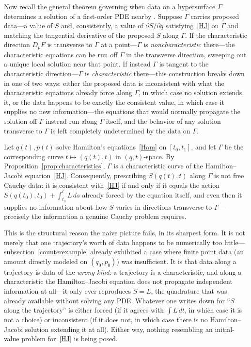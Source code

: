 Now recall the general theorem governing when data on a hypersurface $\Gamma$
determines a solution of a first-order PDE nearby
\cite{evans2010,courant-hilbert1962}. Suppose $\Gamma$ carries proposed
data---a value of $S$ and, consistently, a value of $\partial S/\partial q$
satisfying~\eqref{HJ} on $\Gamma$ and matching the tangential derivative of the
proposed $S$ along $\Gamma$. If the characteristic direction $D_pF$ is
transverse to $\Gamma$ at a point---$\Gamma$ is \emph{noncharacteristic}
there---the characteristic equations can be run off $\Gamma$ in the transverse
direction, sweeping out a unique local solution near that point. If instead
$\Gamma$ is tangent to the characteristic direction---$\Gamma$ is
\emph{characteristic} there---this construction breaks down in one of two ways:
either the proposed data is inconsistent with what the characteristic equations
already force along $\Gamma$, in which case no solution extends it, or the data
happens to be exactly the consistent value, in which case it supplies no new
information---the equations that would normally propagate the solution off
$\Gamma$ instead run along $\Gamma$ itself, and the behavior of any solution
transverse to $\Gamma$ is left completely undetermined by the data on $\Gamma$.

\begin{proposition}
\label{prop:trajectory-characteristic}
Let $q(t),p(t)$ solve Hamilton's equations~\eqref{Ham} on $[t_0,t_1]$, and let
    $\Gamma$ be the corresponding curve $t\mapsto(q(t),t)$ in $(q,t)$-space. By
    Proposition~\ref{prop:characteristics}, $\Gamma$ is a characteristic curve
    of the Hamilton--Jacobi equation~\eqref{HJ}. Consequently, prescribing
    $S(q(t),t)$ along $\Gamma$ is not free Cauchy data: it is consistent
    with~\eqref{HJ} if and only if it equals the action
    $S(q(t_0),t_0)+\int_{t_0}^t L\,ds$ already forced by the equation itself,
    and even then it supplies no information about how $S$ varies in directions
    transverse to $\Gamma$---precisely the information a genuine Cauchy problem
    requires.
\end{proposition}

This is the structural reason the naive picture fails, in its sharpest form. It
is not merely that one trajectory's worth of data happens to be numerically too
little---subsection~\ref{counterexample} already exhibited a case where finite
point data (an amount directly modeled on $(q_0,p_0)$) was insufficient. It is
that data along a trajectory is data of the \emph{wrong kind}: a trajectory is
a characteristic, and along a characteristic the Hamilton--Jacobi equation does
not propagate independent information at all---it only ever reproduces $\dot
S=L$, the quadrature that was already available without solving any PDE.
Whatever one writes down for ``$S$ along the trajectory'' is either forced (if
it agrees with $\int L\,dt$, in which case it is not a choice) or inconsistent
(if it does not, in which case there is no Hamilton--Jacobi solution extending
it at all). Either way, nothing resembling an initial-value problem
for~\eqref{HJ} is being posed.

